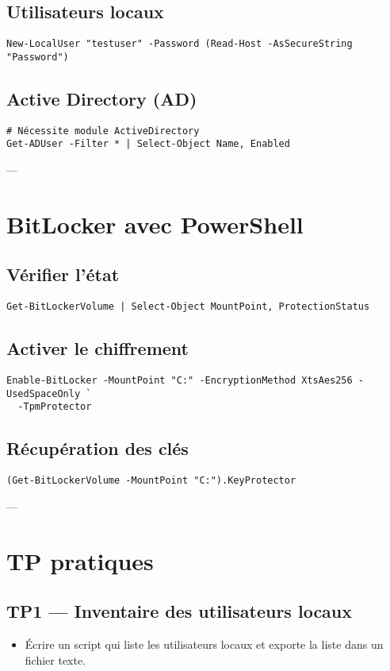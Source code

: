 \documentclass[a4paper,12pt]{article}
\begin{document}
\subsection{Utilisateurs locaux}
\begin{verbatim}
New-LocalUser "testuser" -Password (Read-Host -AsSecureString "Password")
\end{verbatim}

\subsection{Active Directory (AD)}
\begin{verbatim}
# Nécessite module ActiveDirectory
Get-ADUser -Filter * | Select-Object Name, Enabled
\end{verbatim}

---

\section{BitLocker avec PowerShell}
\subsection{Vérifier l’état}
\begin{verbatim}
Get-BitLockerVolume | Select-Object MountPoint, ProtectionStatus
\end{verbatim}

\subsection{Activer le chiffrement}
\begin{verbatim}
Enable-BitLocker -MountPoint "C:" -EncryptionMethod XtsAes256 -UsedSpaceOnly `
  -TpmProtector
\end{verbatim}

\subsection{Récupération des clés}
\begin{verbatim}
(Get-BitLockerVolume -MountPoint "C:").KeyProtector
\end{verbatim}

---

\section{TP pratiques}
\subsection{TP1 — Inventaire des utilisateurs locaux}
\begin{itemize}
  \item Écrire un script qui liste les utilisateurs locaux et exporte la liste dans un fichier texte.
\end{itemize}
\end{document}
